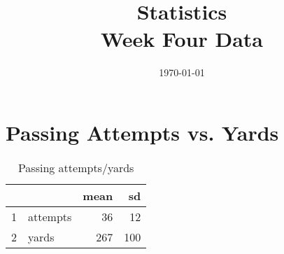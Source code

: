 \documentclass{exam}
\author{}
\title{Statistics \\ Week Four Data}
\date{\today}
\begin{document}

  \section{Passing Attempts vs. Yards}

  \begin{table}[H]
    \centering
    \begin{tabular}{rlrr}
      \toprule
        &          & mean & sd \\
      \midrule
      1 & attempts & 36   & 12 \\
      2 & yards    & 267  & 100 \\
      \bottomrule
    \end{tabular}
    \caption{Passing attempts/yards}
  \end{table}
\end{document}
